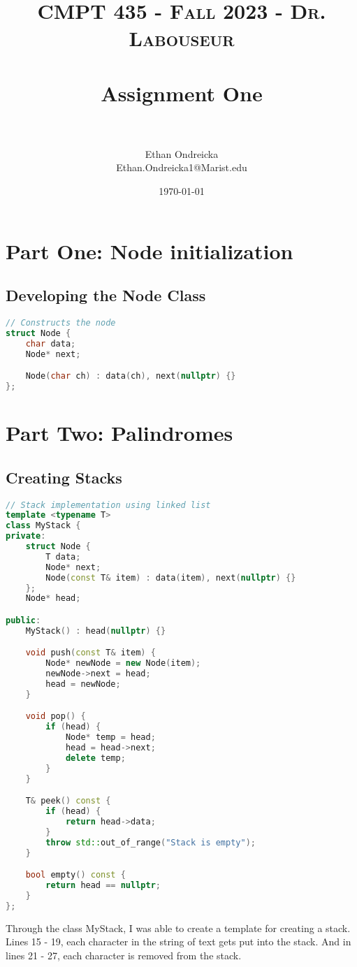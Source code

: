 \documentclass[letterpaper, 10pt,DIV=13]{scrartcl}
\title{	
   \normalfont \normalsize 
   \textsc{CMPT 435 - Fall 2023 - Dr. Labouseur} \\[10pt] %
   \horrule{0.5pt} \\[0.25cm] 	%
   \huge Assignment One  \\     	    %
   \horrule{0.5pt} \\[0.25cm] 	%
}
\author{Ethan Ondreicka \\ \normalsize Ethan.Ondreicka1@Marist.edu}
\date{\normalsize\today} 	%
\numberwithin{equation}{section} %
\numberwithin{figure}{section} %
\numberwithin{table}{section} %
\begin{document}
\maketitle %

\section{Part One: Node initialization}

\subsection{Developing the Node Class}

\begin{lstlisting}[language=c++, caption= Construction of the Node Class]
// Constructs the node
struct Node {
    char data;
    Node* next;

    Node(char ch) : data(ch), next(nullptr) {}
};
\end{lstlisting}
\section{Part Two: Palindromes}
\subsection{Creating Stacks}
\begin{lstlisting}[language=c++, caption= Creation of the Stack class]
// Stack implementation using linked list
template <typename T>
class MyStack {
private:
    struct Node {
        T data;
        Node* next;
        Node(const T& item) : data(item), next(nullptr) {}
    };
    Node* head;

public:
    MyStack() : head(nullptr) {}

    void push(const T& item) {
        Node* newNode = new Node(item);
        newNode->next = head;
        head = newNode;
    }

    void pop() {
        if (head) {
            Node* temp = head;
            head = head->next;
            delete temp;
        }
    }

    T& peek() const {
        if (head) {
            return head->data;
        }
        throw std::out_of_range("Stack is empty");
    }

    bool empty() const {
        return head == nullptr;
    }
};
\end{lstlisting}
Through the class MyStack, I was able to create a template for creating a stack. Lines 15 - 19, 
each character in the string of text gets put into the stack. And in lines 21 - 27, each character is removed from the stack.
\end{document}
